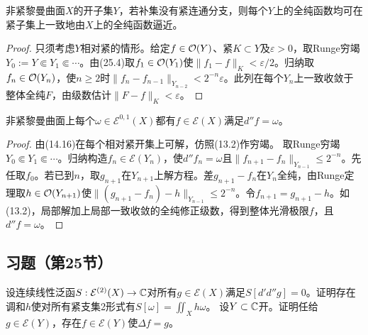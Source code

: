 非紧黎曼曲面$X$的开子集$Y$，若补集没有紧连通分支，则每个$Y$上的全纯函数均可在紧子集上一致地由$X$上的全纯函数逼近。
\begin{proof}
只须考虑$Y$相对紧的情形。给定$f\in\mathcal O(Y)$、紧$K\subset Y$及$\varepsilon>0$，取Runge穷竭$Y_0:=Y\Subset Y_1\Subset\cdots$。由(25.4)取$f_1\in\mathcal O(Y_1)$使$\|f_1-f\|_K<\varepsilon/2$。归纳取$f_n\in\mathcal O(Y_n)$，使$n\ge2$时$\|f_n-f_{n-1}\|_{Y_{n-2}}<2^{-n}\varepsilon$。此列在每个$Y_n$上一致收敛于整体全纯$F$，由级数估计$\|F-f\|_K<\varepsilon$。
\end{proof}
非紧黎曼曲面上每个$\omega\in\mathcal E^{0,1}(X)$都有$f\in\mathcal E(X)$满足$d''f=\omega$。
\begin{proof}
由(14.16)在每个相对紧开集上可解，仿照(13.2)作穷竭。
取Runge穷竭$Y_0\Subset Y_1\Subset\cdots$。归纳构造$f_n\in\mathcal E(Y_n)$，使$d''f_n=\omega$且$\|f_{n+1}-f_n\|_{Y_{n-1}}\le2^{-n}$。先任取$f_0$。若已到$n$，取$g_{n+1}$在$Y_{n+1}$上解方程。差$g_{n+1}-f_n$在$Y_n$全纯，由Runge定理取$h\in\mathcal O(Y_{n+1})$使$\|(g_{n+1}-f_n)-h\|_{Y_{n-1}}\le2^{-n}$。令$f_{n+1}=g_{n+1}-h$。如(13.2)，局部解加上局部一致收敛的全纯修正级数，得到整体光滑极限$f$，且$d''f=\omega$。
\end{proof}
\subsection*{习题（第25节）}
设连续线性泛函$S:\mathcal E^{(2)}(X)\to\mathbb C$对所有$g\in\mathcal E(X)$满足$S[d'd''g]=0$。证明存在调和$h$使对所有紧支集2形式有$S[\omega]=\iint_Xh\omega$。
设$Y\subset\mathbb C$开。证明任给$g\in\mathcal E(Y)$，存在$f\in\mathcal E(Y)$使$\Delta f=g$。
